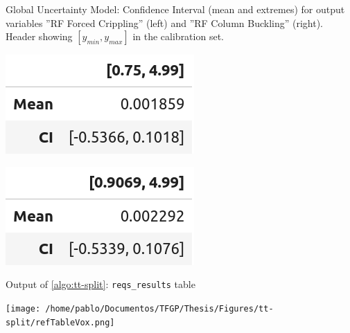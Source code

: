 \begin{table}[!htb]
	\caption{Global Uncertainty Model: Confidence Interval (mean and extremes) for output variables ''RF Forced Crippling'' (left) and ''RF Column Buckling'' (right). Header showing $[y_{min},y_{max}]$ in the calibration set.}
	\centering
	\begin{minipage}[t]{0.4\linewidth}
		\raggedright
		\includegraphics[scale=\tabscale]{Figures/uncertainty/gumtab1.png}
		\label{fig:gumtab1}
	\end{minipage}%
	\begin{minipage}[t]{0.4\linewidth}
		\raggedleft
		\includegraphics[scale=\tabscale]{Figures/uncertainty/gumtab2.png}
		\label{fig:gumtab2}
	\end{minipage}
\end{table}






\clearpage
\mbox{}
\clearpage
\begin{table}[htbp]
	\newlength{\voxrefw}
	\edef\tabvoxrefw{\fpeval{\voxrefw*\tabscale}}
	\begin{minipage}{\dimexpr\tabvoxrefw pt\relax}
		\centering
		\caption{Output of \autoref{algo:tt-split}: \texttt{reqs\_results} table}
		\texttt{[image: /home/pablo/Documentos/TFGP/Thesis/Figures/tt-split/refTableVox.png]}
	\end{minipage}
\end{table}

\begin{table}[htbp]
	\centering
\end{table}


